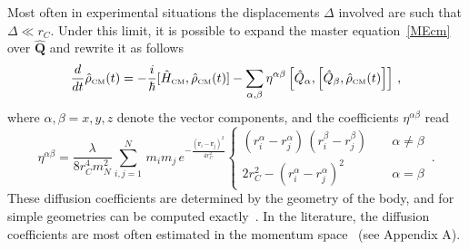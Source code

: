 \documentclass[11pt,onecolumn,amssymb,nofootinbib]{revtex4}
\newcommand\beq{\begin{equation}}
\newcommand\eeq{\end{equation}}
\newcommand\ro{\hat\rho}
\newcommand\Ho{\hat H}
\newcommand\Qo{\hat Q}
\newcommand\br{\boldsymbol{r}}
\newcommand\bQo{\hat{\boldsymbol{Q}}}
\begin{document}
Most often in experimental situations the displacements $\Delta$ involved are such that $\Delta\ll r_C$. Under this limit, it is possible to expand the master equation~\eqref{MEcm} over $\bQo$ and rewrite it as follows~\cite{AdlBasIpp05}
\begin{equation}\label{MEcmsD}
\frac{d}{dt}\hat{\rho}_{\text{\tiny{CM}}}(t)=-\frac{i}{\hbar}[\Ho_{\text{\tiny{CM}}},\ro_{\text{\tiny{CM}}}(t)]-\sum_{\alpha,\beta}\eta^{\alpha\beta}\left[\Qo_\alpha,\left[\Qo_\beta,\ro_{\text{\tiny{CM}}}(t)\right]\right]\,,
\end{equation}
where $\alpha,\beta=x,y,z$ denote the vector components, and the coefficients $\eta^{\alpha\beta}$ read
\beq\label{etadisc}
\eta^{\alpha\beta}=\frac{\lambda}{8 r_C^4m_N^2}\sum_{i,j=1}^N\,m_im_j\,e^{-\frac{(\br_i-\br_j)^2}{4r_C^2}} \left\{
\begin{array}{rcl}
(r_i^\alpha-r_j^\alpha)\, (r_i^\beta-r_j^\beta)&\,\,&\alpha\neq\beta\\
2r_C^2-(r_i^\alpha-r_j^\alpha)^2&\,\,&\alpha=\beta
\end{array}\right.\,.
\eeq
These diffusion coefficients are determined by the geometry of the body, and for simple geometries can be computed exactly~\cite{NimHorHam14,Beletal16,Caretal16}. In the literature, the diffusion coefficients are most often estimated in the momentum space~\cite{NimHorHam14,Caretal16,Vinetal17,CarFerBas18} (see Appendix A).
\end{document}
